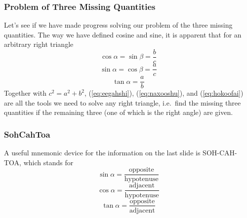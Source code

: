 \documentclass[xcolor=dvipsnames]{beamer}
\begin{document}
\begin{frame}
  \frametitle{Problem of Three Missing Quantities}
  Let's see if we have made progress solving our problem of the three
  missing quantities. The way we have defined cosine and sine, it is
  apparent that for an arbitrary right triangle
  \begin{equation}
    \label{eq:eegahshi}
    \cos\alpha=\sin\beta=\frac{b}{c}
  \end{equation}
  \begin{equation}
    \label{eq:naxooshu}
    \sin\alpha=\cos\beta=\frac{a}{c}
  \end{equation}
  \begin{equation}
    \label{eq:hokoofai}
    \tan\alpha=\frac{a}{b}
  \end{equation}
  Together with $c^{2}=a^{2}+b^{2}$, (\ref{eq:eegahshi}),
  (\ref{eq:naxooshu}), and (\ref{eq:hokoofai}) are all the tools we
  need to solve any right triangle, i.e.\ find the missing three
  quantities if the remaining three (one of which is the right angle)
  are given.
\end{frame}

\begin{frame}
  \frametitle{SohCahToa}
A useful mnemonic device for the information on the last slide is
SOH-CAH-TOA, which stands for
\begin{equation}
  \label{eq:igeizeis}
  \sin\alpha=\frac{\mbox{opposite}}{\mbox{hypotenuse}}
\end{equation}
\begin{equation}
  \label{eq:eepheiku}
  \cos\alpha=\frac{\mbox{adjacent}}{\mbox{hypotenuse}}
\end{equation}
\begin{equation}
  \label{eq:eengiegh}
  \tan\alpha=\frac{\mbox{opposite}}{\mbox{adjacent}}
\end{equation}
\end{frame}
\end{document}
